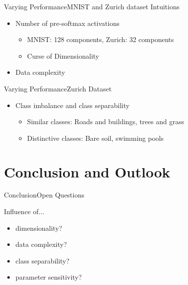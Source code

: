 \documentclass{beamer}
\begin{document}
\begin{frame}{Varying Performance}{MNIST and Zurich dataset}
Intuitions
	\begin{itemize}
		\item Number of pre-softmax activations
		\begin{itemize}
			\item \gls{MNIST}: 128 components, Zurich: 32 components
			\item Curse of Dimensionality
		\end{itemize}
		\item Data complexity
	\end{itemize}
\end{frame}
\begin{frame}{Varying Performance}{Zurich Dataset}
	\begin{itemize}
		\item Class imbalance and class separability
		\begin{itemize}
			\item Similar classes: Roads and buildings, trees and grass
			\item Distinctive classes: Bare soil, swimming pools
		\end{itemize}
	\end{itemize}
\end{frame}



\section{Conclusion and Outlook}

\begin{frame}{Conclusion}{Open Questions}

Influence of...
\begin{itemize}
	\item dimensionality?
	\item data complexity?
	\item class separability?
	\item parameter sensitivity?
\end{itemize}
\end{frame}
\end{document}
